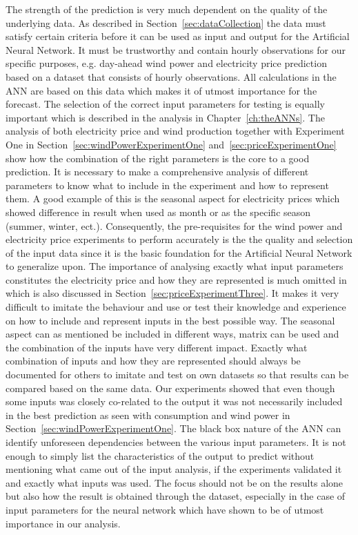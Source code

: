 The strength of the prediction is very much dependent on the quality of the underlying data. As described in Section~\ref{sec:dataCollection} the data must satisfy certain criteria before it can be used as input and output for the Artificial Neural Network. It must be trustworthy and contain hourly observations for our specific purposes, e.g. day-ahead wind power and electricity price prediction based on a dataset that consists of hourly observations. All calculations in the ANN are based on this data which makes it of utmost importance for the forecast. The selection of the correct input parameters for testing is equally important which is described in the analysis in Chapter~\ref{ch:theANNs}. The analysis of both electricity price and wind production together with Experiment One in Section~\ref{sec:windPowerExperimentOne} and~\ref{sec:priceExperimentOne} show how the combination of the right parameters is the core to a good prediction. It is necessary to make a comprehensive analysis of different parameters to know what to include in the experiment and how to represent them. A good example of this is the seasonal aspect for electricity prices which showed difference in result when used as month or as the specific season (summer, winter, ect.). Consequently, the pre-requisites for the wind power and electricity price experiments to perform accurately is the the quality and selection of the input data since it is the basic foundation for the Artificial Neural Network to generalize upon. The importance of analysing exactly what input parameters constitutes the electricity price and how they are represented is much omitted in\cite{ShortTermWindPowerForecasting,singhal2011electricity} which is also discussed in Section~\ref{sec:priceExperimentThree}. It makes it very difficult to imitate the behaviour and use or test their knowledge and experience on how to include and represent inputs in the best possible way. The seasonal aspect can as mentioned be included in different ways, matrix can be used and the combination of the inputs have very different impact. Exactly what combination of inputs and how they are represented should always be documented for others to imitate and test on own datasets so that results can be compared based on the same data. Our experiments showed that even though some inputs was closely co-related to the output it was not necessarily included in the best prediction as seen with consumption and wind power in Section~\ref{sec:windPowerExperimentOne}. The black box nature of the ANN can identify unforeseen dependencies between the various input parameters. It is not enough to simply list the characteristics of the output to predict without mentioning what came out of the input analysis, if the experiments validated it and exactly what inputs was used. The focus should not be on the results alone but also how the result is obtained through the dataset, especially in the case of input parameters for the neural network which have shown to be of utmost importance in our analysis.

